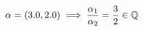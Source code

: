 \documentclass[preview]{standalone}
\begin{document}
\begin{align*}
\special{dvisvgm:raw <g id='unique000'>}\alpha = (3.0, 2.0) \implies \frac{\alpha_1}{\alpha_2} = \frac{3}{2} \in \mathbb{Q}\special{dvisvgm:raw </g>}
\end{align*}
\end{document}
